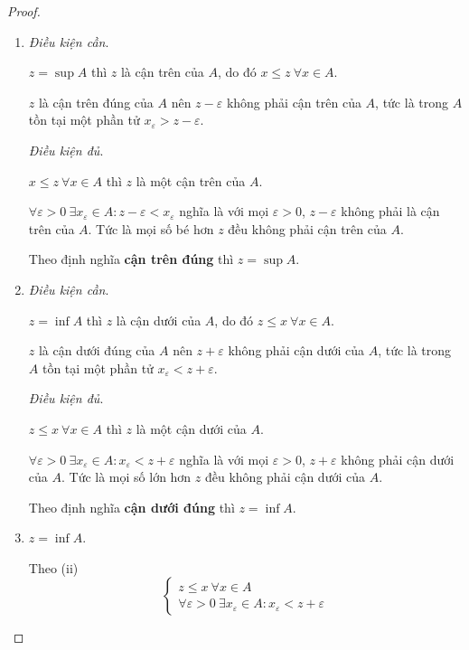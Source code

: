 \documentclass[class=analysis,crop=false]{standalone}
\begin{document}
\begin{proof}
    \begin{enumerate}[label = (\roman*)]
        \item\textit{Điều kiện cần}.
             \par $z = \sup A$ thì $z$ là cận trên của $A$, do đó $x\le z\ \forall x\in A$.
             \par $z$ là cận trên đúng của $A$ nên $z - \varepsilon$ không phải cận trên của $A$, tức là trong $A$ tồn tại một phần tử $x_{\varepsilon} > z - \varepsilon$.
             \par\textit{Điều kiện đủ}.
             \par $x\le z\ \forall x\in A$ thì $z$ là một cận trên của $A$.
             \par $\forall\varepsilon > 0\ \exists x_{\varepsilon}\in A : z - \varepsilon < x_{\varepsilon}$ nghĩa là với mọi $\varepsilon > 0$, $z - \varepsilon$ không phải là cận trên của $A$. Tức là mọi số bé hơn $z$ đều không phải cận trên của $A$.
             \par Theo định nghĩa \textbf{cận trên đúng} thì $z = \sup A$.
        \item\textit{Điều kiện cần}.
             \par $z = \inf A$ thì $z$ là cận dưới của $A$, do đó $z\le x\ \forall x\in A$.
             \par $z$ là cận dưới đúng của $A$ nên $z + \varepsilon$ không phải cận dưới của $A$, tức là trong $A$ tồn tại một phần tử $x_{\varepsilon} < z + \varepsilon$.
             \par\textit{Điều kiện đủ}.
             \par $z\le x\ \forall x\in A$ thì $z$ là một cận dưới của $A$.
             \par $\forall\varepsilon > 0\ \exists x_{\varepsilon}\in A : x_{\varepsilon} < z + \varepsilon$ nghĩa là với mọi $\varepsilon > 0$, $z + \varepsilon$ không phải cận dưới của $A$. Tức là mọi số lớn hơn $z$ đều không phải cận dưới của $A$.
             \par Theo định nghĩa \textbf{cận dưới đúng} thì $z = \inf A$.
        \item $z = \inf A$.
             \par Theo (ii)
             \[
                 \begin{cases}
                     z\le x\ \forall x\in A \\
                     \forall\varepsilon > 0\ \exists x_{\varepsilon}\in A : x_{\varepsilon} < z + \varepsilon

\end{cases}\]
\end{enumerate}
\end{proof}
\end{document}
